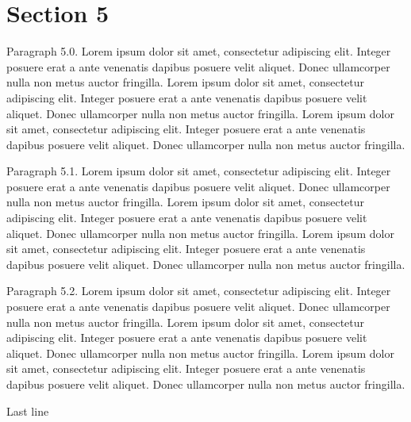 \documentclass{article}
\begin{document}
\section{Section 5}
Paragraph 5.0. Lorem ipsum dolor sit amet, consectetur adipiscing elit. Integer posuere erat a ante venenatis dapibus posuere velit aliquet. Donec ullamcorper nulla non metus auctor fringilla. Lorem ipsum dolor sit amet, consectetur adipiscing elit. Integer posuere erat a ante venenatis dapibus posuere velit aliquet. Donec ullamcorper nulla non metus auctor fringilla. Lorem ipsum dolor sit amet, consectetur adipiscing elit. Integer posuere erat a ante venenatis dapibus posuere velit aliquet. Donec ullamcorper nulla non metus auctor fringilla. 

Paragraph 5.1. Lorem ipsum dolor sit amet, consectetur adipiscing elit. Integer posuere erat a ante venenatis dapibus posuere velit aliquet. Donec ullamcorper nulla non metus auctor fringilla. Lorem ipsum dolor sit amet, consectetur adipiscing elit. Integer posuere erat a ante venenatis dapibus posuere velit aliquet. Donec ullamcorper nulla non metus auctor fringilla. Lorem ipsum dolor sit amet, consectetur adipiscing elit. Integer posuere erat a ante venenatis dapibus posuere velit aliquet. Donec ullamcorper nulla non metus auctor fringilla. 

Paragraph 5.2. Lorem ipsum dolor sit amet, consectetur adipiscing elit. Integer posuere erat a ante venenatis dapibus posuere velit aliquet. Donec ullamcorper nulla non metus auctor fringilla. Lorem ipsum dolor sit amet, consectetur adipiscing elit. Integer posuere erat a ante venenatis dapibus posuere velit aliquet. Donec ullamcorper nulla non metus auctor fringilla. Lorem ipsum dolor sit amet, consectetur adipiscing elit. Integer posuere erat a ante venenatis dapibus posuere velit aliquet. Donec ullamcorper nulla non metus auctor fringilla. 

Last line 
\end{document}
